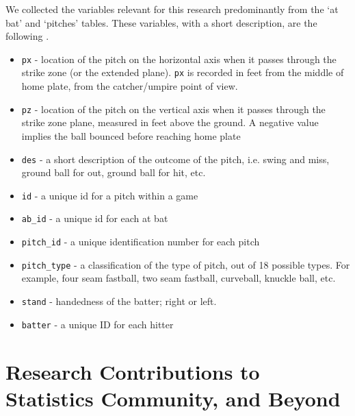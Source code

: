 We collected the variables relevant for this research predominantly from the `at bat' and `pitches' tables. These variables, with a short description, are the following \citep{Fast2007}.
  \begin{itemize}
  \item \verb|px| - location of the pitch on the horizontal axis when it passes through the strike zone (or the extended plane). \verb|px| is recorded in feet from the middle of home plate, from the catcher/umpire point of view.
  \item \verb|pz| - location of the pitch on the vertical axis when it passes through the strike zone plane, measured in feet above the ground. A negative value implies the ball bounced before reaching home plate
  \item \verb|des| - a short description of the outcome of the pitch, i.e. swing and miss, ground ball for out, ground ball for hit, etc.  
  \item \verb|id| - a unique id for a pitch within a game
  \item \verb|ab_id| - a unique id for each at bat  
  \item \verb|pitch_id| - a unique identification number for each pitch
  \item \verb|pitch_type| - a classification of the type of pitch, out of 18 possible types. For example, four seam fastball, two seam fastball, curveball, knuckle ball, etc.
  \item \verb|stand| - handedness of the batter; right or left.
  \item \verb|batter| - a unique ID for each hitter
  \end{itemize}


\section{Research Contributions to Statistics Community, and Beyond}

